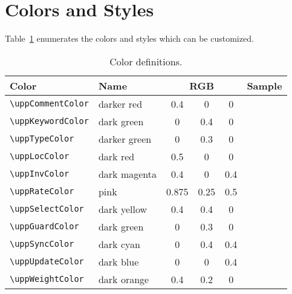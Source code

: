 \documentclass[english,paper=a4,final]{article}
\newcommand{\cmdtt}[1]{{\tt \textbackslash#1}}
\begin{document}
\section{Colors and Styles}
Table~\ref{tab:colors} enumerates the colors and styles which can be customized.

\begin{table}[ht]
  \caption{Color definitions.}\label{tab:colors}
  \centering
  \setlength{\fboxsep}{0pt}
\begin{tabular}{llc@{, }c@{, }cc}
  \toprule
  {\bf Color} & {\bf Name} & \multicolumn{3}{c}{\bf RGB} & {\bf Sample} \\
  \midrule
  \cmdtt{uppCommentColor} & darker red & 0.4 & 0 & 0 & \fbox{\color{uppCommentColor}\rule{10mm}{3mm}} \\
  \cmdtt{uppKeywordColor} & dark green & 0 & 0.4 & 0 & \fbox{\color{uppKeywordColor}\rule{10mm}{3mm}} \\
  \cmdtt{uppTypeColor} & darker green & 0 & 0.3 & 0 & \fbox{\color{uppTypeColor}\rule{10mm}{3mm}} \\
  \midrule
  \cmdtt{uppLocColor} & dark red & 0.5 & 0 & 0 & \fbox{\color{uppLocColor}\rule{10mm}{3mm}} \\
  \cmdtt{uppInvColor} & dark magenta & 0.4 & 0 & 0.4 & \fbox{\color{uppInvColor}\rule{10mm}{3mm}} \\
  \cmdtt{uppRateColor} & pink & 0.875 & 0.25 & 0.5 & \fbox{\color{uppRateColor}\rule{10mm}{3mm}} \\
  \cmdtt{uppSelectColor} & dark yellow & 0.4 & 0.4 & 0 & \fbox{\color{uppSelectColor}\rule{10mm}{3mm}} \\
  \cmdtt{uppGuardColor} & dark green & 0 & 0.3 & 0 & \fbox{\color{uppGuardColor}\rule{10mm}{3mm}} \\
  \cmdtt{uppSyncColor} & dark cyan & 0 & 0.4 & 0.4 & \fbox{\color{uppSyncColor}\rule{10mm}{3mm}} \\
  \cmdtt{uppUpdateColor} & dark blue & 0 & 0 & 0.4 & \fbox{\color{uppUpdateColor}\rule{10mm}{3mm}} \\
  \cmdtt{uppWeightColor} & dark orange & 0.4 & 0.2 & 0 & \fbox{\color{uppWeightColor}\rule{10mm}{3mm}} \\
  \bottomrule
\end{tabular}
\end{table}
\end{document}
